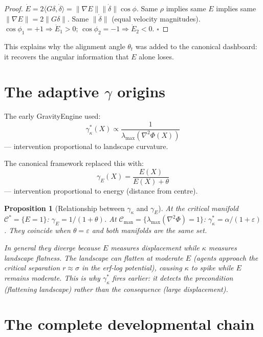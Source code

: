 \documentclass[11pt,a4paper,openany]{book}
\newtheorem{proposition}[theorem]{Proposition}
\theoremstyle{definition}
\begin{document}
\begin{proof}
$\dot E = 2\langle G\delta, \dot\delta\rangle = \|\nabla E\|\|\dot\delta\|\cos\phi$.
Same $\rho$ implies same $E$ implies same $\|\nabla E\| = 2\|G\delta\|$.
Same $\|\dot\delta\|$ (equal velocity magnitudes).
$\cos\phi_1 = +1\Rightarrow\dot E_1 > 0$; $\cos\phi_2 = -1\Rightarrow\dot E_2 < 0$.
$\square$
\end{proof}

This explains why the alignment angle $\theta_t$ was added to the canonical dashboard:
it recovers the angular information that $E$ alone loses.

\section{The adaptive $\gamma$ origins}

The early GravityEngine used:
\[
\gamma^*_\kappa(X) \propto \frac{1}{\lambda_\mathrm{max}(\nabla^2\Phi(X))}
\]
— intervention proportional to landscape curvature.

The canonical framework replaced this with:
\[
\gamma_E(X) = \frac{E(X)}{E(X)+\theta}
\]
— intervention proportional to energy (distance from centre).

\begin{proposition}[Relationship between $\gamma_\kappa$ and $\gamma_E$]
At the critical manifold $\mathcal{C}^* = \{E=1\}$:
$\gamma_E = 1/(1+\theta)$.
At $\mathcal{C}_\mathrm{man} = \{\lambda_\mathrm{max}(\nabla^2\Phi)=1\}$:
$\gamma^*_\kappa = \alpha/(1+\varepsilon)$.
They coincide when $\theta = \varepsilon$ and both manifolds are the same set.

In general they diverge because $E$ measures displacement while $\kappa$ measures
landscape flatness. The landscape can flatten at moderate $E$
(agents approach the critical separation $r \approx \sigma$ in the erf-log potential),
causing $\kappa$ to spike while $E$ remains moderate.
This is why $\gamma^*_\kappa$ fires earlier: it detects the precondition
(flattening landscape) rather than the consequence (large displacement).
\end{proposition}

\section{The complete developmental chain}
\end{document}
